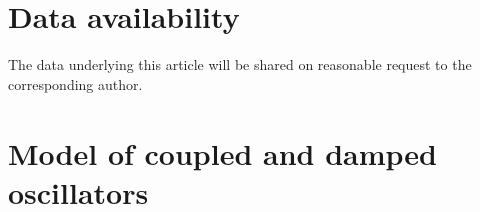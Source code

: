 \documentclass[fleqn,usenatbib]{mnras}
\begin{document}
\section*{Data availability}
The data underlying this article will be shared on reasonable request to the corresponding author.










\appendix

\section{Model of coupled and damped oscillators}
\label{APPENDIX_Coupling_Model}
\end{document}
